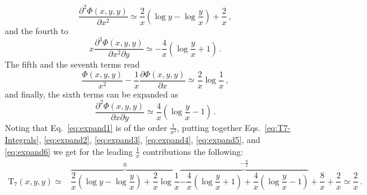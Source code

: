 \documentclass[10pt]{report}
\newcommand{\ro}[1]{\textrm{#1}}
\renewcommand{\(}{\left(}
\renewcommand{\)}{\right)}
\renewcommand{\[}{\left[}
\renewcommand{\]}{\right]}
\newcommand{\del}{\partial}
\begin{document}
\begin{equation}
    \dfrac{\del^2 \Phi(x,y,y)}{\del x^2} \simeq \dfrac{2}{x} \( \log y - \log \dfrac{y}{x} \) + \dfrac{2}{x} \,,
    \label{eq:expand3}
\end{equation}
and the fourth to
\begin{equation}
    x \dfrac{\del^3 \Phi(x,y,y)}{\del x^2 \del y} \simeq -\dfrac{4}{x}\(\log \dfrac{y}{x} + 1 \)\,.
    \label{eq:expand4}
\end{equation}
The fifth and the seventh terms read
\begin{equation}
    \dfrac{\Phi(x,y,y)}{x^2}
    -\dfrac{1}{x} \dfrac{\del \Phi(x,y,y)}{\del x} \simeq \dfrac{2}{x} \log \dfrac{1}{x} \,,
    \label{eq:expand5}
\end{equation}
and finally, the sixth terms can be expanded as
\begin{equation}
    \dfrac{\del^2 \Phi(x,y,y)}{\del x \del y} \simeq \dfrac{4}{x}\(\log \dfrac{y}{x} -1\)\,.
    \label{eq:expand6}
\end{equation}
Noting that Eq.~\eqref{eq:expand1} is of the order $\tfrac{1}{x^2}$, putting together Eqs.~\eqref{eq:T7-Integrals}, \eqref{eq:expand2}, \eqref{eq:expand3}, \eqref{eq:expand4}, \eqref{eq:expand5}, and \eqref{eq:expand6} we get for the leading $\tfrac{1}{x}$ contributions the following:
\begin{equation}
    \begin{aligned}
    \ro{T}_7\(x,y,y\) \simeq& \overbrace{\dfrac{2}{x} \( \log y - \log \dfrac{y}{x} \) + \dfrac{2}{x} \log \dfrac{1}{x}}^{0} \overbrace{-\dfrac{4}{x}\(\log \dfrac{y}{x} + 1 \) +
    \dfrac{4}{x}\(\log \dfrac{y}{x} -1\)}^{-\tfrac{8}{x}} + \dfrac{8}{x} + \dfrac{2}{x} \simeq \dfrac{2}{x}\,.
    \end{aligned}
    \label{eq:T7-expanded}
\end{equation}

\newpage



\end{document}
